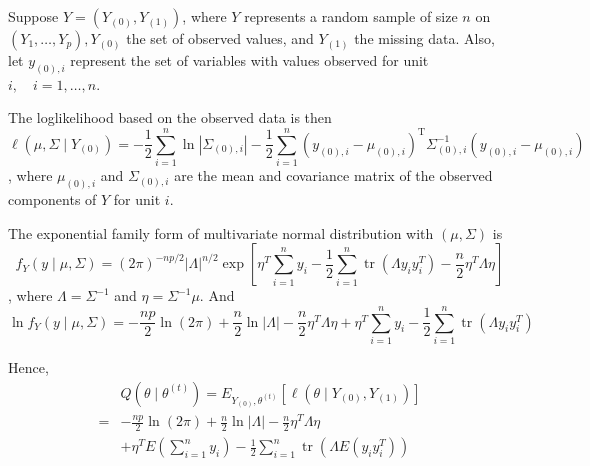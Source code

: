 \begin{example}
	Suppose $Y=\left(Y_{(0)}, Y_{(1)}\right)$, where $Y$ represents a random sample of size $n$ on $\left(Y_{1}, \ldots, Y_{p}\right), Y_{(0)}$ the set of observed values, and $Y_{(1)}$ the missing data. Also, let $y_{(0), i}$ represent the set of variables with values observed for unit $i, \quad i=1, \ldots, n$.

	The loglikelihood based on the observed data is then
	\begin{equation}
		\ell\left(\mu, \Sigma \mid Y_{(0)}\right)=-\frac{1}{2} \sum_{i=1}^{n} \ln \left|\Sigma_{(0), i}\right|-\frac{1}{2} \sum_{i=1}^{n}\left(y_{(0), i}-\mu_{(0), i}\right)^{\mathrm{T}} \Sigma_{(0), i}^{-1}\left(y_{(0), i}-\mu_{(0), i}\right)
	\end{equation}
	, where $\mu_{(0), i}$ and $\Sigma_{(0), i}$ are the mean and covariance matrix of the observed components of $Y$ for unit $i$.

	The exponential family form of multivariate normal distribution with $\left(\mu,\Sigma\right)$ is
	\begin{equation}
		f_{Y}(y\mid\mu,\Sigma)=(2\pi)^{-np/2}|\Lambda|^{n/2}\exp\left[\eta^{T}\sum_{i=1}^{n}y_{i}-\frac{1}{2}\sum_{i=1}^{n}\operatorname{tr}\left(\Lambda y_{i}y_{i}^{T}\right)-\frac{n}{2}\eta^{T}\Lambda\eta\right]
	\end{equation}
	, where $\Lambda=\Sigma^{-1}$ and $\eta=\Sigma^{-1}\mu$. And
	\begin{equation}
		\ln f_{Y}(y\mid\mu,\Sigma)=-\frac{np}{2}\ln(2\pi)+\frac{n}{2}\ln|\Lambda|-\frac{n}{2}\eta^{T}\Lambda\eta+\eta^{T}\sum_{i=1}^{n}y_{i}-\frac{1}{2}\sum_{i=1}^{n}\operatorname{tr}\left(\Lambda y_{i}y_{i}^{T}\right)
	\end{equation}

	Hence,
	\begin{equation}
		\begin{aligned}
			  & Q\left(\theta\mid\theta^{(t)}\right)=E_{Y_{(0)},\theta^{(t)}}\left[\ell\left(\theta\mid Y_{(0)},Y_{(1)}\right)\right]                  \\
			= & -\frac{np}{2}\ln(2\pi)+\frac{n}{2}\ln|\Lambda|-\frac{n}{2}\eta^{T}\Lambda\eta                                                          \\
			  & +\eta^{T}E\left(\sum_{i=1}^{n}y_{i}\right)-\frac{1}{2}\sum_{i=1}^{n}\operatorname{tr}\left(\Lambda E\left(y_{i}y_{i}^{T}\right)\right)
		\end{aligned}
	\end{equation}


\end{example}
